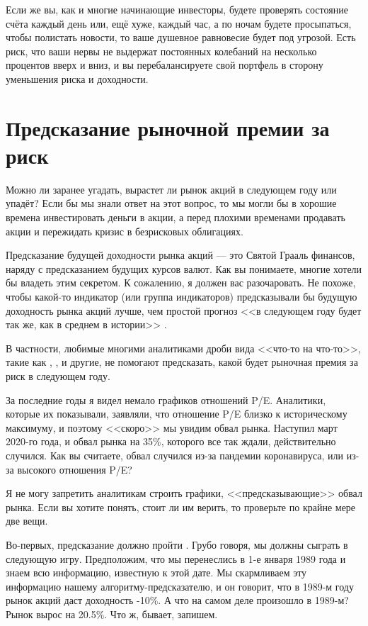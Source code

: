 Если же вы, как и многие начинающие инвесторы, будете проверять состояние счёта каждый день или, ещё хуже, каждый час, а по ночам будете просыпаться, чтобы полистать новости, то ваше душевное равновесие будет под угрозой. Есть риск, что ваши нервы не выдержат постоянных колебаний на несколько процентов вверх и вниз, и вы перебалансируете свой портфель в сторону уменьшения риска и доходности.

\section*{Предсказание рыночной премии за риск}

Можно ли заранее угадать, вырастет ли рынок акций в следующем году или упадёт? Если бы мы знали ответ на этот вопрос, то мы могли бы в хорошие времена инвестировать деньги в акции, а перед плохими временами продавать акции и пережидать кризис в безрисковых облигациях.

Предсказание будущей доходности рынка акций --- это Святой Грааль финансов, наряду с предсказанием будущих курсов валют. Как вы понимаете, многие хотели бы владеть этим секретом. К сожалению, я должен вас разочаровать. Не похоже, чтобы какой-то индикатор (или группа индикаторов) предсказывали бы будущую доходность рынка акций лучше, чем простой прогноз <<в следующем году будет так же, как в среднем в истории>> \cite{welch2008comprehensive}.

В частности, любимые многими аналитиками дроби вида <<что-то на что-то>>, такие как , ,  и другие, не помогают предсказать, какой будет рыночная премия за риск в следующем году. 

За последние годы я видел немало графиков отношений P/E. Аналитики, которые их показывали, заявляли, что отношение P/E близко к историческому максимуму, и поэтому <<скоро>> мы увидим обвал рынка. Наступил март 2020-го года, и обвал рынка на 35\%, которого все так ждали, действительно случился. Как вы считаете, обвал случился из-за пандемии коронавируса, или из-за высокого отношения P/E?

Я не могу запретить аналитикам строить графики, <<предсказывающие>> обвал рынка. Если вы хотите понять, стоит ли им верить, то проверьте по крайне мере две вещи.

Во-первых, предсказание должно пройти  . Грубо говоря, мы должны сыграть в следующую игру. Предположим, что мы перенеслись в 1-е января 1989 года и знаем всю информацию, известную к этой дате. Мы скармливаем эту информацию нашему алгоритму-предсказателю, и он говорит, что в 1989-м году рынок акций даст доходность -10\%. А что на самом деле произошло в 1989-м? Рынок вырос на 20.5\%. Что ж, бывает, запишем.

